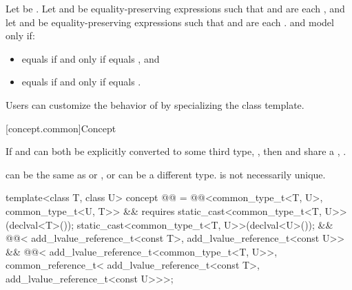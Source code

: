 \begin{itemdescr}
\pnum
Let  be .
Let  and  be equality-preserving
expressions such that
 and  are each , and
let  and  be equality-preserving expressions such that
 and  are each .
 and  model 
only if:
\begin{itemize}
\item {} equals  if and only if
   equals , and
\item {} equals  if and only if
   equals .
\end{itemize}

\pnum
\begin{note}
Users can customize the behavior of  by specializing
the  class template.
\end{note}
\end{itemdescr}

[concept.common]{Concept }

\pnum
If  and  can both be explicitly converted to some third type,
, then  and  share a ,
.
\begin{note}
 can be the same as  or , or can be a
different type.  is not necessarily unique.
\end{note}

\begin{itemdecl}
template<class T, class U>
  concept @@ =
    @@<common_type_t<T, U>, common_type_t<U, T>> &&
    requires {
      static_cast<common_type_t<T, U>>(declval<T>());
      static_cast<common_type_t<T, U>>(declval<U>());
    } &&
    @@<
      add_lvalue_reference_t<const T>,
      add_lvalue_reference_t<const U>> &&
    @@<
      add_lvalue_reference_t<common_type_t<T, U>>,
      common_reference_t<
        add_lvalue_reference_t<const T>,
        add_lvalue_reference_t<const U>>>;
\end{itemdecl}


